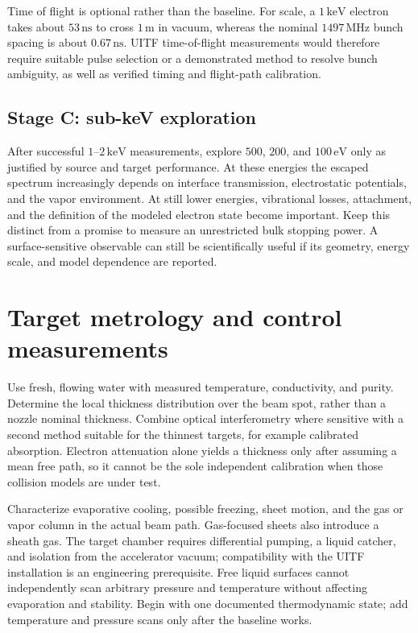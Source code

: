 \documentclass[11pt,letterpaper]{article}
\newcommand{\eV}{\,\mathrm{eV}}
\newcommand{\keV}{\,\mathrm{keV}}
\begin{document}
Time of flight is optional rather than the baseline. For scale, a $1\keV$ electron takes about
$53\,\mathrm{ns}$ to cross $1\,\mathrm{m}$ in vacuum, whereas the nominal $1497\,\mathrm{MHz}$
bunch spacing is about $0.67\,\mathrm{ns}$. UITF time-of-flight measurements would therefore require
suitable pulse selection or a demonstrated method to resolve bunch ambiguity, as well as verified
timing and flight-path calibration.

\subsection{Stage C: sub-keV exploration}

After successful $1$--$2\keV$ measurements, explore $500$, $200$, and $100\eV$ only as justified
by source and target performance. At these energies the escaped spectrum increasingly depends on
interface transmission, electrostatic potentials, and the vapor environment. At still lower energies,
vibrational losses, attachment, and the definition of the modeled electron state become important.
Keep this distinct from a promise to measure an unrestricted bulk stopping power. A surface-sensitive
observable can still be scientifically useful if its geometry, energy scale, and model dependence
are reported.

\section{Target metrology and control measurements}

Use fresh, flowing water with measured temperature, conductivity, and purity. Determine the local
thickness distribution over the beam spot, rather than a nozzle nominal thickness. Combine optical
interferometry where sensitive with a second method suitable for the thinnest targets, for example
calibrated absorption. Electron attenuation alone yields a thickness only after assuming a mean
free path, so it cannot be the sole independent calibration when those collision models are under test.

Characterize evaporative cooling, possible freezing, sheet motion, and the gas or vapor column in
the actual beam path. Gas-focused sheets also introduce a sheath gas. The target chamber requires
differential pumping, a liquid catcher, and isolation from the accelerator vacuum; compatibility
with the UITF installation is an engineering prerequisite. Free liquid surfaces cannot independently
scan arbitrary pressure and temperature without affecting evaporation and stability. Begin with one
documented thermodynamic state; add temperature and pressure scans only after the baseline works.
\end{document}
